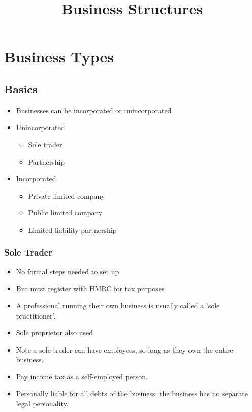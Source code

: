 \documentclass[
]{article}
\title{Business Structures}
\author{}
\date{}
\providecommand{\tightlist}{%
  \setlength{\itemsep}{0pt}\setlength{\parskip}{0pt}}
\begin{document}
\maketitle

{
\setcounter{tocdepth}{3}
\tableofcontents
}
\hypertarget{business-types}{%
\section{Business Types}\label{business-types}}

\hypertarget{basics}{%
\subsection{Basics}\label{basics}}

\begin{itemize}
\tightlist
\item
  Businesses can be incorporated or unincorporated
\item
  Unincorporated

  \begin{itemize}
  \tightlist
  \item
    Sole trader
  \item
    Partnership
  \end{itemize}
\item
  Incorporated

  \begin{itemize}
  \tightlist
  \item
    Private limited company
  \item
    Public limited company
  \item
    Limited liability partnership
  \end{itemize}
\end{itemize}

\hypertarget{sole-trader}{%
\subsubsection{Sole Trader}\label{sole-trader}}

\begin{itemize}
\tightlist
\item
  No formal steps needed to set up
\item
  But must register with HMRC for tax purposes
\item
  A professional running their own business is usually called a 'sole
  practitioner'.
\item
  Sole proprietor also used
\item
  Note a sole trader can have employees, so long as they own the entire
  business.
\item
  Pay income tax as a self-employed person.
\item
  Personally liable for all debts of the business: the business has no
  separate legal personality.
\end{itemize}
\end{document}
